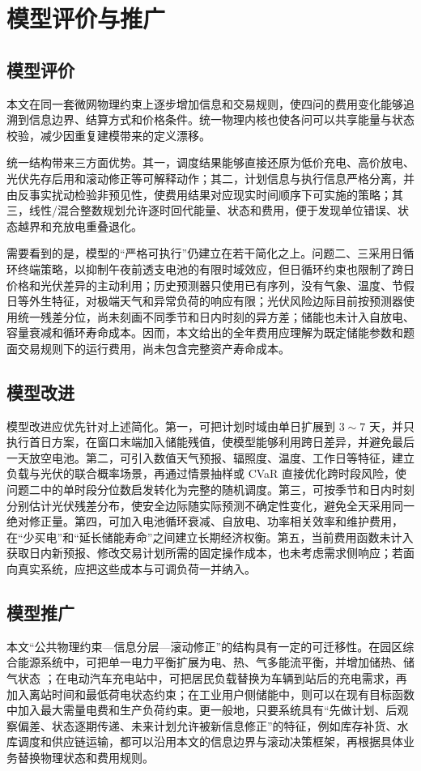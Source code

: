 \section{模型评价与推广}

\subsection{模型评价}

本文在同一套微网物理约束上逐步增加信息和交易规则，使四问的费用变化能够追溯到信息边界、结算方式和价格条件。统一物理内核也使各问可以共享能量与状态校验，减少因重复建模带来的定义漂移。

统一结构带来三方面优势。其一，调度结果能够直接还原为低价充电、高价放电、光伏先存后用和滚动修正等可解释动作；其二，计划信息与执行信息严格分离，并由反事实扰动检验非预见性，使费用结果对应现实时间顺序下可实施的策略；其三，线性/混合整数规划允许逐时回代能量、状态和费用，便于发现单位错误、状态越界和充放电重叠退化。

需要看到的是，模型的“严格可执行”仍建立在若干简化之上。问题二、三采用日循环终端策略，以抑制午夜前透支电池的有限时域效应，但日循环约束也限制了跨日价格和光伏差异的主动利用；历史预测器只使用已有序列，没有气象、温度、节假日等外生特征，对极端天气和异常负荷的响应有限；光伏风险边际目前按预测器使用统一残差分位，尚未刻画不同季节和日内时刻的异方差；储能也未计入自放电、容量衰减和循环寿命成本。因而，本文给出的全年费用应理解为既定储能参数和题面交易规则下的运行费用，尚未包含完整资产寿命成本。

\subsection{模型改进}
\label{sec:improve}

模型改进应优先针对上述简化。第一，可把计划时域由单日扩展到 $3\sim7$ 天，并只执行首日方案，在窗口末端加入储能残值，使模型能够利用跨日差异，并避免最后一天放空电池。第二，可引入数值天气预报、辐照度、温度、工作日等特征，建立负载与光伏的联合概率场景，再通过情景抽样或 CVaR 直接优化跨时段风险，使问题二中的单时段分位数启发转化为完整的随机调度。第三，可按季节和日内时刻分别估计光伏残差分布，使安全边际随实际预测不确定性变化，避免全天采用同一绝对修正量。第四，可加入电池循环衰减、自放电、功率相关效率和维护费用，在“少买电”和“延长储能寿命”之间建立长期经济权衡。第五，当前费用函数未计入获取日内新预报、修改交易计划所需的固定操作成本，也未考虑需求侧响应；若面向真实系统，应把这些成本与可调负荷一并纳入。

\subsection{模型推广}

本文“公共物理约束—信息分层—滚动修正”的结构具有一定的可迁移性。在园区综合能源系统中，可把单一电力平衡扩展为电、热、气多能流平衡，并增加储热、储气状态 \cite{liu2018dayahead}；在电动汽车充电站中，可把居民负载替换为车辆到站后的充电需求，再加入离站时间和最低荷电状态约束；在工业用户侧储能中，则可以在现有目标函数中加入最大需量电费和生产负荷约束。更一般地，只要系统具有“先做计划、后观察偏差、状态逐期传递、未来计划允许被新信息修正”的特征，例如库存补货、水库调度和供应链运输，都可以沿用本文的信息边界与滚动决策框架，再根据具体业务替换物理状态和费用规则。
